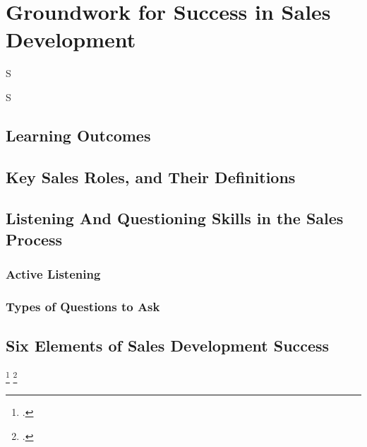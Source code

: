 \frenchspacing
\chapter{Groundwork for Success in Sales Development}
\epigraph{S}{S}

%
\section{Learning Outcomes}
%
\section{Key Sales Roles, and Their Definitions}

%
\section{Listening And Questioning Skills in the Sales Process}
\subsection{Active Listening}
\subsection{Types of Questions to Ask}

% 
\section{Six Elements of Sales Development Success}
\footcite{bertuzzi2016sales}
\footcite{cherry2017questions}

%
\printbibliography[heading=secbibliography, title={References}]